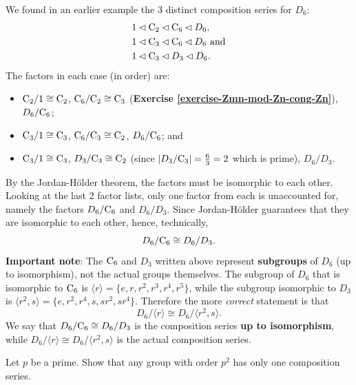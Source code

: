 \newpage

\begin{example}
    We found in an earlier example the 3 distinct composition series for $D_6$:
    \begin{align*}
        &1 \lhd \mathrm{C}_{2} \lhd \mathrm{C}_{6} \lhd D_6,\\
        &1 \lhd \mathrm{C}_{3} \lhd \mathrm{C}_{6} \lhd D_6 \text{ and}\\
        &1 \lhd \mathrm{C}_{3} \lhd D_3 \lhd D_6.
    \end{align*}
    The factors in each case (in order) are:
    \begin{itemize}
        \item $\mathrm{C}_{2}/1 \cong \mathrm{C}_{2}$, $\mathrm{C}_{6}/\mathrm{C}_{2} \cong \mathrm{C}_{3}$ (\textbf{Exercise \ref{exercise-Zmn-mod-Zn-cong-Zn}}), $D_6 / \mathrm{C}_{6}$;
        \item $\mathrm{C}_{3}/1 \cong \mathrm{C}_{3}$, $\mathrm{C}_{6}/\mathrm{C}_{3} \cong \mathrm{C}_{2}$, $D_6 / \mathrm{C}_{6}$; and
        \item $\mathrm{C}_{3}/1 \cong \mathrm{C}_{3}$, $D_3 / \mathrm{C}_{3} \cong \mathrm{C}_{2}$ (since $|D_3 / \mathrm{C}_{3}| = \frac{6}{3} = 2$ which is prime), $D_6 / D_3$.
    \end{itemize}
    By the Jordan-H\"older theorem, the factors must be isomorphic to each other. Looking at the last 2 factor lists, only one factor from each is unaccounted for, namely the factors $D_6 / \mathrm{C}_{6}$ and $D_6 / D_3$. Since Jordan-H\"older guarantees that they are isomorphic to each other, hence, technically,
    \[
            D_6 / \mathrm{C}_{6} \cong D_6 / D_3.
    \]
    \textbf{Important note}: The $\mathrm{C}_{6}$ and $D_3$ written above represent \textbf{subgroups} of $D_6$ (up to isomorphism), not the actual groups themselves. The subgroup of $D_6$ that is isomorphic to $\mathrm{C}_{6}$ is $\langle r \rangle = \{e, r, r^2, r^3, r^4, r^5\}$, while the subgroup isomorphic to $D_3$ is $\langle r^2, s\rangle = \{e, r^2, r^4, s, sr^2, sr^4\}$. Therefore the more \textit{correct} statement is that
    \[
        D_6 / \langle r \rangle \cong D_6 / \langle r^2, s\rangle.
    \]
    We say that $D_6 / \mathrm{C}_{6} \cong D_6 / D_3$ is the composition series \textbf{up to isomorphism}, while $D_6 / \langle r \rangle \cong D_6 / \langle r^2, s\rangle$ is the actual composition series.
\end{example}

\begin{exercise}
    Let $p$ be a prime. Show that any group with order $p^2$ has only one composition series.
\end{exercise}
    
\newpage

